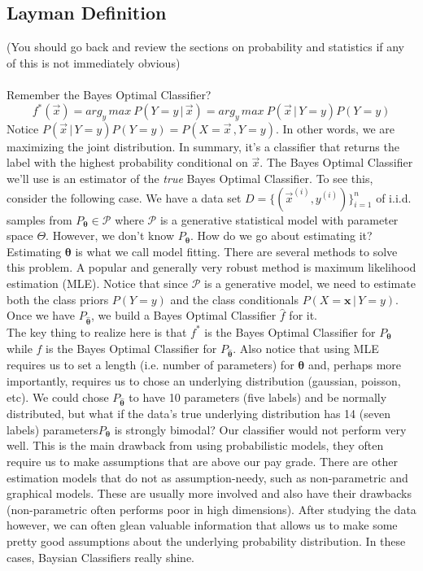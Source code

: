 \documentclass[10pt]{article}
\begin{document}
	\subsection*{Layman Definition}
		(You should go back and review the sections on probability and statistics if any of this is not immediately obvious) \\ \\
		Remember the Bayes Optimal Classifier? 		
		$$ f^*(\vec x) = arg_y \, max \ P(Y = y\, | \, \vec x ) = arg_y \, max \ P(\vec x \, | \, Y=y)P(Y = y)$$
		Notice $P(\vec x \, | \, Y=y)P(Y = y) = P(X=\vec x \, , Y=y)$. In other words, we are maximizing 
		the joint distribution. 
		In summary, it's a classifier that returns the label with the highest probability conditional on $\vec x$. 
		The Bayes Optimal Classifier we'll use is an estimator of the \textit{true} Bayes Optimal Classifier. 
		To see this, consider the following case. We have a data set $D = \{ (\vec x^{(i)}, y^{(i)})\}_{i=1}^n$ of
		i.i.d. samples from $P_{\pmb \theta} \in \mathcal P$ where $\mathcal P$ is a generative statistical model with 
		parameter space $\Theta$. However, we don't know $P_{\pmb \theta}$. How do we go about estimating it? 
		Estimating $\pmb \theta$ is what we call model fitting. There are several methods to solve this problem. 
		A popular and generally very robust method is maximum likelihood estimation (MLE). Notice 
		that since $\mathcal P$ is a generative model, we need to estimate both the class priors $P(Y=y)$ and the class 
		conditionals $P(X=\textbf{x} \, | \, Y=y)$. Once we have $P_{\hat{ \pmb \theta}}$, we build a Bayes 
		Optimal Classifier $\hat f$ for it. \\
		
		\noindent The key thing to realize here is that $f^*$ is the Bayes Optimal Classifier for $P_{\pmb \theta}$ while
		$\hat f$ is the Bayes Optimal Classifier for $P_{\hat{ \pmb \theta}}$. Also notice that using MLE requires us to
		set a length (i.e. number of parameters) for $\pmb \theta$ and, perhaps more importantly, requires us to chose 
		an underlying distribution (gaussian, poisson, etc). We could chose $P_{\hat{\pmb \theta}}$ to have 10 
		parameters (five labels) and be normally distributed, but what if the data's true underlying distribution has 
		14 (seven labels) parameters$P_{{\pmb \theta}}$ is strongly bimodal? Our classifier would not perform very
		well. This is the main drawback from using probabilistic models, they often require us to make assumptions that
		are above our pay grade. There are other estimation models that do not as assumption-needy, such as 
		non-parametric and graphical models. These are usually more involved and also have their drawbacks 
		(non-parametric often performs poor in high dimensions). After studying the data however,  we can often 
		glean valuable information that allows us to make some pretty good assumptions about the underlying 
		probability distribution. In these cases, Baysian Classifiers really shine.
		\\ 
		
\end{document}
